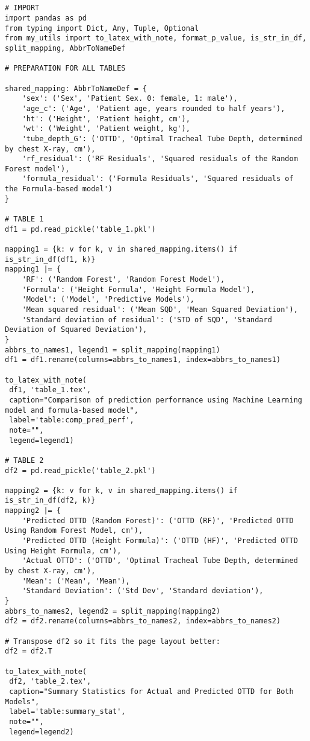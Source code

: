 \documentclass[11pt]{article}
\begin{document}
\begin{verbatim}


# IMPORT
import pandas as pd
from typing import Dict, Any, Tuple, Optional
from my_utils import to_latex_with_note, format_p_value, is_str_in_df, split_mapping, AbbrToNameDef

# PREPARATION FOR ALL TABLES

shared_mapping: AbbrToNameDef = {
    'sex': ('Sex', 'Patient Sex. 0: female, 1: male'),
    'age_c': ('Age', 'Patient age, years rounded to half years'),
    'ht': ('Height', 'Patient height, cm'),
    'wt': ('Weight', 'Patient weight, kg'),
    'tube_depth_G': ('OTTD', 'Optimal Tracheal Tube Depth, determined by chest X-ray, cm'),
    'rf_residual': ('RF Residuals', 'Squared residuals of the Random Forest model'),
    'formula_residual': ('Formula Residuals', 'Squared residuals of the Formula-based model')
}

# TABLE 1
df1 = pd.read_pickle('table_1.pkl')

mapping1 = {k: v for k, v in shared_mapping.items() if is_str_in_df(df1, k)}
mapping1 |= {
    'RF': ('Random Forest', 'Random Forest Model'),
    'Formula': ('Height Formula', 'Height Formula Model'),
    'Model': ('Model', 'Predictive Models'),
    'Mean squared residual': ('Mean SQD', 'Mean Squared Deviation'),
    'Standard deviation of residual': ('STD of SQD', 'Standard Deviation of Squared Deviation'),
}
abbrs_to_names1, legend1 = split_mapping(mapping1)
df1 = df1.rename(columns=abbrs_to_names1, index=abbrs_to_names1)

to_latex_with_note(
 df1, 'table_1.tex',
 caption="Comparison of prediction performance using Machine Learning model and formula-based model", 
 label='table:comp_pred_perf',
 note="",
 legend=legend1)

# TABLE 2
df2 = pd.read_pickle('table_2.pkl')

mapping2 = {k: v for k, v in shared_mapping.items() if is_str_in_df(df2, k)}
mapping2 |= {
    'Predicted OTTD (Random Forest)': ('OTTD (RF)', 'Predicted OTTD Using Random Forest Model, cm'),
    'Predicted OTTD (Height Formula)': ('OTTD (HF)', 'Predicted OTTD Using Height Formula, cm'),
    'Actual OTTD': ('OTTD', 'Optimal Tracheal Tube Depth, determined by chest X-ray, cm'),
    'Mean': ('Mean', 'Mean'),
    'Standard Deviation': ('Std Dev', 'Standard deviation'),
}
abbrs_to_names2, legend2 = split_mapping(mapping2)
df2 = df2.rename(columns=abbrs_to_names2, index=abbrs_to_names2)

# Transpose df2 so it fits the page layout better:
df2 = df2.T

to_latex_with_note(
 df2, 'table_2.tex',
 caption="Summary Statistics for Actual and Predicted OTTD for Both Models", 
 label='table:summary_stat',
 note="",
 legend=legend2)

\end{verbatim}
\end{document}
